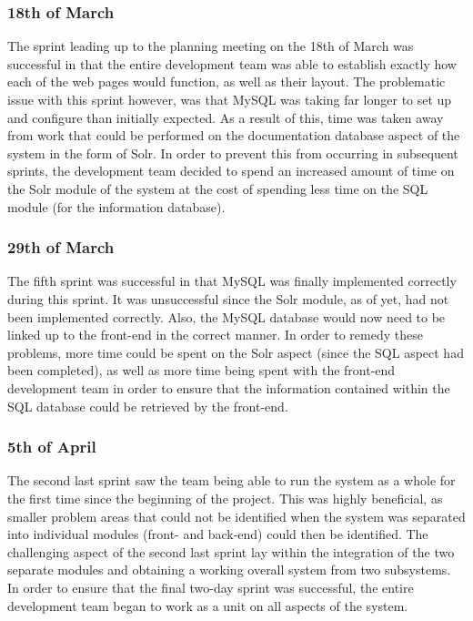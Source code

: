 \documentclass[journal]{IEEEtran}
\begin{document}
\subsubsection{18th of March}

The sprint leading up to the planning meeting on the 18th of March was successful in that the entire development team was able to establish exactly how each of the web pages would function, as well as their layout. The problematic issue with this sprint however, was that MySQL was taking far longer to set up and configure than initially expected. As a result of this, time was taken away from work that could be performed on the documentation database aspect of the system in the form of Solr. In order to prevent this from occurring in subsequent sprints, the development team decided to spend an increased amount of time on the Solr module of the system at the cost of spending less time on the SQL module (for the information database).
\\

\subsubsection{29th of March}

The fifth sprint was successful in that MySQL was finally implemented correctly during this sprint. It was unsuccessful since the Solr module, as of yet, had not been implemented correctly. Also, the MySQL database would now need to be linked up to the front-end in the correct manner. In order to remedy these problems, more time could be spent on the Solr aspect (since the SQL aspect had been completed), as well as more time being spent with the front-end development team in order to ensure that the information contained within the SQL database could be retrieved by the front-end.
\\

\subsubsection{5th of April}

The second last sprint saw the team being able to run the system as a whole for the first time since the beginning of the project. This was highly beneficial, as smaller problem areas that could not be identified when the system was separated into individual modules (front- and back-end) could then be identified. The challenging aspect of the second last sprint lay within the integration of the two separate modules and obtaining a working overall system from two subsystems. In order to ensure that the final two-day sprint was successful, the entire development team began to work as a unit on all aspects of the system.
\\
\end{document}
